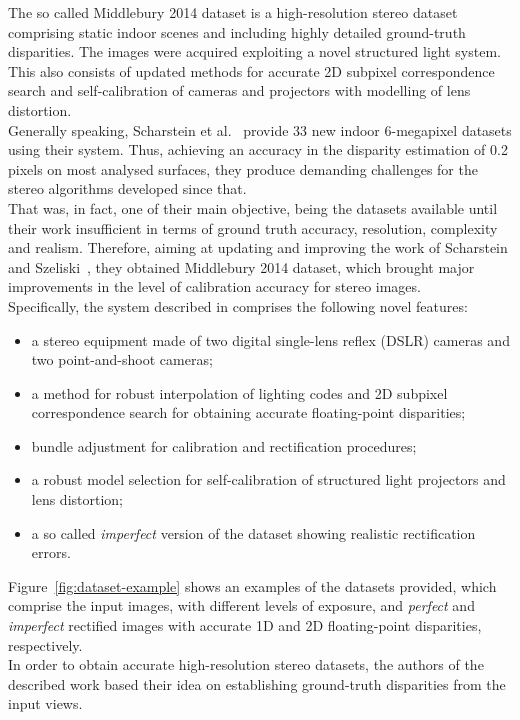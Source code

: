 The so called Middlebury 2014 dataset is a high-resolution stereo dataset comprising static indoor scenes and including highly detailed ground-truth disparities.
The images were acquired exploiting a novel structured light system.
This also consists of updated methods for accurate 2D subpixel correspondence search and self-calibration of cameras and projectors with modelling of lens distortion.\\
Generally speaking, Scharstein et al.~\cite{Scharstein2014} provide 33 new indoor 6-megapixel datasets using their system. 
Thus, achieving an accuracy in the disparity estimation of 0.2 pixels on most analysed surfaces, they produce demanding challenges for the stereo algorithms developed since that.\\
That was, in fact, one of their main objective, being the datasets available until their work insufficient in terms of ground truth accuracy, resolution, complexity and realism. 
Therefore, aiming at updating and improving the work of Scharstein and Szeliski~\cite{scharstein2003high}, they obtained Middlebury 2014 dataset, which brought major improvements in the level of calibration accuracy for stereo images.\\
Specifically, the system described in \cite{Scharstein2014} comprises the following novel features: 
\begin{itemize}
	\item a stereo equipment made of two digital single-lens reflex (DSLR) cameras and two point-and-shoot cameras;
	\item a method for robust interpolation of lighting codes and 2D subpixel correspondence search for obtaining accurate floating-point disparities;
	\item bundle adjustment for calibration and rectification procedures;
	\item a robust model selection for self-calibration of structured light projectors and lens distortion;
	\item a so called \textit{imperfect} version of the dataset showing realistic rectification errors.
\end{itemize}  
Figure~\ref{fig:dataset-example} shows an examples of the datasets provided, which comprise the input images, with different levels of exposure, and \textit{perfect} and \textit{imperfect} rectified images with accurate 1D and 2D floating-point disparities, respectively. \\
In order to obtain accurate high-resolution stereo datasets, the authors of the described work based their idea on establishing ground-truth disparities from the input views.
